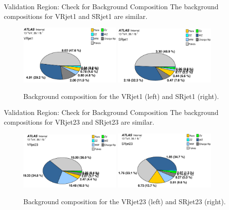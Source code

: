 \documentclass[mathserif,serif]{beamer}
\begin{document}
\begin{frame}{Validation Region: Check for Background Composition}
The background compositions for VRjet1 and SRjet1 are similar.
\begin{figure}
\centering
\includegraphics[width=0.45\textwidth]{data/plot/VR/BkgComposition_VRjet1.eps}
\includegraphics[width=0.45\textwidth]{data/plot/VR/BkgComposition_SRjet1.eps}
\caption{Background composition for the VRjet1 (left) and SRjet1 (right).}
\end{figure}
\end{frame}

\begin{frame}{Validation Region: Check for Background Composition}
The background compositions for VRjet23 and SRjet23 are similar.
\begin{figure}
\centering
\includegraphics[width=0.45\textwidth]{data/plot/VR/BkgComposition_VRjet23.eps}
\includegraphics[width=0.45\textwidth]{data/plot/VR/BkgComposition_SRjet23.eps}
\caption{Background composition for the VRjet23 (left) and SRjet23 (right).}
\end{figure}
\end{frame}
\end{document}
